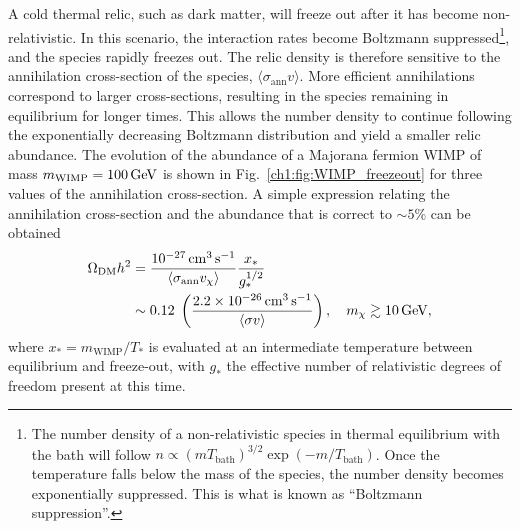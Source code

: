 A cold thermal relic, such as dark matter, will freeze out after it has become non-relativistic. In this scenario, the interaction rates become Boltzmann suppressed\footnote{The number density of a non-relativistic species in thermal equilibrium with the bath will follow $n \propto \left(m T_\mathrm{bath}\right)^{3/2} \exp\left(-m /T_\mathrm{bath}\right)$. Once the temperature falls below the mass of the species, the number density becomes exponentially suppressed. This is what is known as ``Boltzmann suppression''.}, and the species rapidly freezes out. The relic density is therefore sensitive to the annihilation cross-section of the species, $\langle \sigma_\mathrm{ann} v\rangle$. More efficient annihilations correspond to larger cross-sections, resulting in the species remaining in equilibrium for longer times. This allows the number density to continue following the exponentially decreasing Boltzmann distribution and yield a smaller relic abundance. The evolution of the abundance of a Majorana fermion WIMP of mass $m_\mathrm{WIMP} = 100{\rm \,GeV}$ is shown in Fig.~\ref{ch1:fig:WIMP_freezeout} for three values of the annihilation cross-section. A simple expression  relating the annihilation cross-section and the abundance that is correct to $\sim5\%$ can be obtained~\cite{Steigman:2012nb_PreciseRelicWIMP} 
\begin{align}
    \Omega_{\mathrm{DM}}h^2 & = \frac{10^{-27}{\rm \,cm}^3{\rm \,s}^{-1}}{\langle \sigma_{\rm ann} v_\chi \rangle} \frac{x_*}{g_*^{1/2}}\\
     &\sim 0.12 \; \left(\frac{2.2\times 10^{-26}{\rm \,cm}^3 {\rm \,s}^{-1}}{\langle \sigma v\rangle}\right),\quad m_\chi\gtrsim 10{\rm \,GeV},
\end{align}
where $x_* = m_\mathrm{WIMP}/T_*$ is evaluated at an intermediate temperature between equilibrium and freeze-out, with $g_*$ the effective number of relativistic degrees of freedom present at this time. 

